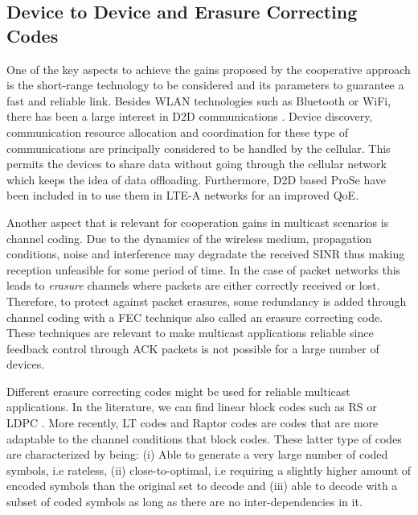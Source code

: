 \subsection{Device to Device and Erasure Correcting Codes}
One of the key aspects to achieve the gains proposed by the cooperative approach is the short-range technology to be considered and its parameters to guarantee a fast and reliable link. Besides \ac{WLAN} technologies such as Bluetooth or \ac{WiFi}, there has been a large interest in \ac{D2D} communications \cite{lin2013comprehensive,asadi2014survey,feng2014device,tehrani2014device}. Device discovery, communication resource allocation and coordination for these type of communications are principally considered to be handled by the cellular. This permits the devices to share data without going through the cellular network which keeps the idea of data offloading. Furthermore, \ac{D2D} based \ac{ProSe} have been included in \cite{3gpp2012prose} to use them in \ac{LTE-A} networks for an improved \ac{QoE}.

Another aspect that is relevant for cooperation gains in multicast scenarios is channel coding. Due to the dynamics of the wireless medium, propagation conditions, noise and interference may degradate the received \ac{SINR} thus making reception unfeasible for some period of time. In the case of packet networks this leads to \textit{erasure} channels where packets are either correctly received or lost. Therefore, to protect against packet erasures, some redundancy is added through channel coding with a \ac{FEC} technique also called an erasure correcting code. These techniques are relevant to make multicast applications reliable since feedback control through \ac{ACK} packets is not possible for a large number of devices.

Different erasure correcting codes might be used for reliable multicast applications. In the literature, we can find linear block codes such as \ac{RS} \cite{reed1960polynomial} or \ac{LDPC} \cite{gallager1962low}. More recently, \ac{LT} codes \cite{luby2002lt} and Raptor codes \cite{shokrollahi2006raptor} are codes that are more adaptable to the channel conditions that block codes. These latter type of codes are characterized by being: (i) Able to generate a very large number of coded symbols, i.e rateless, (ii) close-to-optimal, i.e requiring a slightly higher amount of encoded symbols than the original set to decode and (iii) able to decode with a subset of coded symbols as long as there are no inter-dependencies in it.

